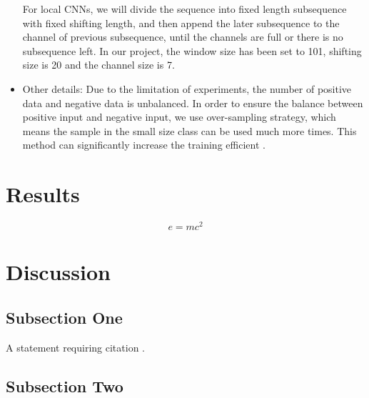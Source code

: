 \documentclass[twoside,twocolumn]{article}
\begin{document}
\begin{itemize}
    For local CNNs, we will divide the sequence into fixed length subsequence with fixed shifting length, and then append the later subsequence to the channel of previous subsequence, until the channels are full or there is no subsequence left. In our project, the window size has been set to 101, shifting size is 20 and the channel size is 7.

    \item Other details: Due to the limitation of experiments, the number of positive data and negative data is unbalanced. In order to ensure the balance between positive input and negative input, we use over-sampling strategy, which means the sample in the small size class can be used much more times. This method can significantly increase the training efficient \cite{ref4}.
\end{itemize}
\section{Results}

\blindtext %

\begin{equation}
\label{eq:emc}
e = mc^2
\end{equation}

\blindtext %


\section{Discussion}

\subsection{Subsection One}

A statement requiring citation \cite{Figueredo:2009dg}.
\blindtext %

\subsection{Subsection Two}

\blindtext %

\end{document}
